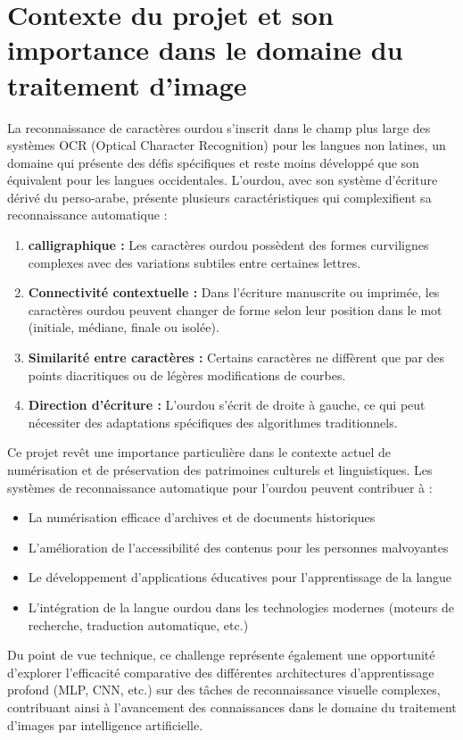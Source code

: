 \section{Contexte du projet et son importance dans le domaine du traitement d'image} 
\begin{flushleft}


La reconnaissance de caractères ourdou s'inscrit dans le champ plus large des systèmes OCR (Optical Character Recognition) pour les langues non latines, un domaine qui présente des défis spécifiques et reste moins développé que son équivalent pour les langues occidentales. L'ourdou, avec son système d'écriture dérivé du perso-arabe, présente plusieurs caractéristiques qui complexifient sa reconnaissance automatique :

\begin{enumerate}
\item \textbf{calligraphique :} Les caractères ourdou possèdent des formes curvilignes complexes avec des variations subtiles entre certaines lettres.
\item \textbf{Connectivité contextuelle :} Dans l'écriture manuscrite ou imprimée, les caractères ourdou peuvent changer de forme selon leur position dans le mot (initiale, médiane, finale ou isolée).
\item \textbf{Similarité entre caractères :} Certains caractères ne diffèrent que par des points diacritiques ou de légères modifications de courbes.
\item \textbf{Direction d'écriture :} L'ourdou s'écrit de droite à gauche, ce qui peut nécessiter des adaptations spécifiques des algorithmes traditionnels.
\end{enumerate}

Ce projet revêt une importance particulière dans le contexte actuel de numérisation et de préservation des patrimoines culturels et linguistiques. Les systèmes de reconnaissance automatique pour l'ourdou peuvent contribuer à :
\begin{itemize}
\item La numérisation efficace d'archives et de documents historiques
\item L'amélioration de l'accessibilité des contenus pour les personnes malvoyantes
\item Le développement d'applications éducatives pour l'apprentissage de la langue
\item L'intégration de la langue ourdou dans les technologies modernes (moteurs de recherche, traduction automatique, etc.)
\end{itemize}

Du point de vue technique, ce challenge représente également une opportunité d'explorer l'efficacité comparative des différentes architectures d'apprentissage profond (MLP, CNN, etc.) sur des tâches de reconnaissance visuelle complexes, contribuant ainsi à l'avancement des connaissances dans le domaine du traitement d'images par intelligence artificielle.
\end{flushleft}

